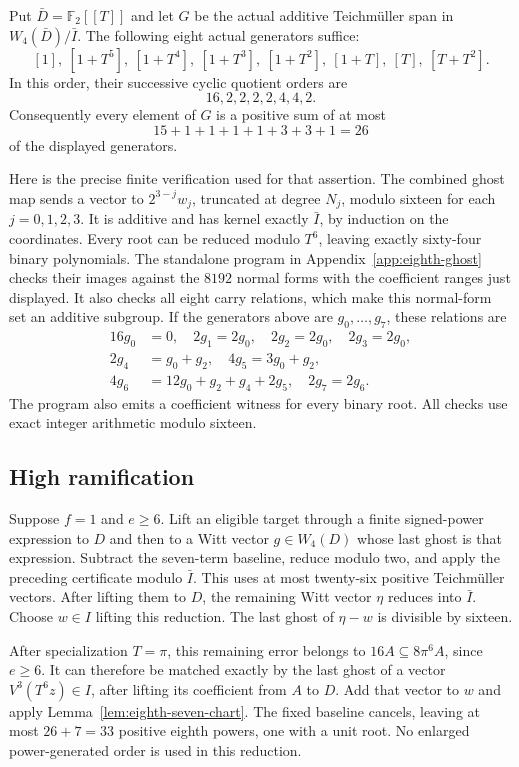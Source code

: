 \documentclass[11pt,reqno]{amsart}
\numberwithin{equation}{section}
\theoremstyle{definition}
\begin{document}
Put $\bar D=\mathbb F_2[[T]]$ and let $G$ be the actual additive
Teichm\"uller span in $W_4(\bar D)/\bar I$.
The following eight actual generators suffice:
\[
 [1],\ [1+T^5],\ [1+T^4],\ [1+T^3],\ [1+T^2],\
 [1+T],\ [T],\ [T+T^2].
\]
In this order, their successive cyclic quotient orders are
\[
 16,2,2,2,2,4,4,2.
\]
Consequently every element of $G$ is a positive sum of at most
\[
 15+1+1+1+1+3+3+1=26
\]
of the displayed generators.

Here is the precise finite verification used for that assertion.
The combined ghost map sends a vector to $2^{3-j}w_j$, truncated
at degree $N_j$, modulo sixteen for each $j=0,1,2,3$.
It is additive and has kernel exactly $\bar I$, by induction on the
coordinates. Every root can be reduced modulo $T^6$, leaving exactly
sixty-four binary polynomials. The standalone program in Appendix~\ref{app:eighth-ghost} checks their images
against the $8192$ normal forms with the coefficient ranges just
displayed. It also checks all eight carry relations, which make this
normal-form set an additive subgroup. If the generators above are
$g_0,\ldots,g_7$, these relations are
\[
 \begin{split}
 16g_0&=0,\quad 2g_1=2g_0,\quad2g_2=2g_0,\quad2g_3=2g_0,\\
 2g_4&=g_0+g_2,\quad4g_5=3g_0+g_2,\\
 4g_6&=12g_0+g_2+g_4+2g_5,\quad2g_7=2g_6.
 \end{split}
\]
The program also emits a coefficient witness for every binary root. All checks use exact integer arithmetic modulo sixteen.

\subsection{High ramification}

Suppose $f=1$ and $e\ge6$. Lift an eligible target through a finite
signed-power expression to $D$ and then to a Witt vector $g\in W_4(D)$
whose last ghost is that expression. Subtract the seven-term baseline,
reduce modulo two, and apply the preceding certificate modulo $\bar I$.
This uses at most twenty-six positive Teichm\"uller vectors. After
lifting them to $D$, the remaining Witt vector $\eta$ reduces into
$\bar I$. Choose $w\in I$ lifting this reduction. The last ghost of
$\eta-w$ is divisible by sixteen.

After specialization $T=\pi$, this remaining error belongs to
$16A\subseteq8\pi^6A$, since $e\ge6$. It can therefore be matched
exactly by the last ghost of a vector $V^3(T^6z)\in I$, after lifting
its coefficient from $A$ to $D$. Add that vector to $w$ and apply
Lemma~\ref{lem:eighth-seven-chart}. The fixed baseline cancels, leaving
at most $26+7=33$ positive eighth powers, one with a unit root.
No enlarged power-generated order is used in this reduction.
\end{document}
